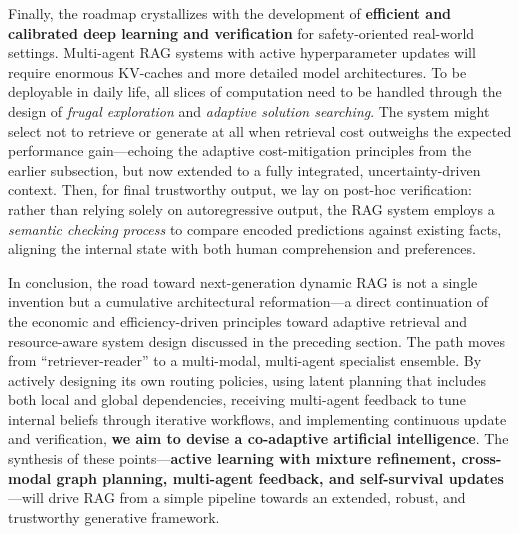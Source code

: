 \documentclass[11pt]{article}
\begin{document}
Finally, the roadmap crystallizes with the development of \textbf{efficient and calibrated deep learning and verification} for safety-oriented real-world settings. Multi-agent RAG systems with active hyperparameter updates will require enormous KV-caches and more detailed model architectures. To be deployable in daily life, all slices of computation need to be handled through the design of \emph{frugal exploration} and \emph{adaptive solution searching}. The system might select not to retrieve or generate at all when retrieval cost outweighs the expected performance gain---echoing the adaptive cost-mitigation principles from the earlier subsection, but now extended to a fully integrated, uncertainty-driven context. Then, for final trustworthy output, we lay on post-hoc verification: rather than relying solely on autoregressive output, the RAG system employs a \emph{semantic checking process} to compare encoded predictions against existing facts, aligning the internal state with both human comprehension and preferences.

In conclusion, the road toward next-generation dynamic RAG is not a single invention but a cumulative architectural reformation---a direct continuation of the economic and efficiency-driven principles toward adaptive retrieval and resource-aware system design discussed in the preceding section. The path moves from ``retriever-reader'' to a multi-modal, multi-agent specialist ensemble. By actively designing its own routing policies, using latent planning that includes both local and global dependencies, receiving multi-agent feedback to tune internal beliefs through iterative workflows, and implementing continuous update and verification, \textbf{we aim to devise a co-adaptive artificial intelligence}. The synthesis of these points---\textbf{active learning with mixture refinement, cross-modal graph planning, multi-agent feedback, and self-survival updates}---will drive RAG from a simple pipeline towards an extended, robust, and trustworthy generative framework.
\end{document}
